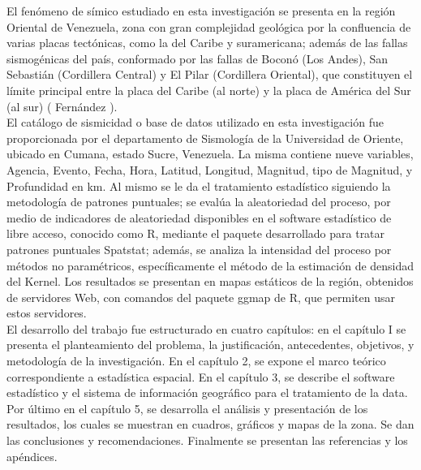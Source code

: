 \documentclass[12pt]{report}
\begin{document}
 El fenómeno de símico estudiado en esta investigación se presenta en la región Oriental de  Venezuela, zona con gran complejidad geológica por la confluencia de varias placas tectónicas, como la del  Caribe y suramericana;  además de las fallas sismogénicas del país, conformado por las fallas de Boconó (Los Andes), San Sebastián (Cordillera Central) y El Pilar (Cordillera Oriental), que constituyen el límite principal entre la placa del Caribe (al norte) y la placa de América del Sur (al sur) ( Fernández  \cite{Fernandez}). \\

El  catálogo de sismicidad o base de datos utilizado en esta investigación fue proporcionada por el departamento de Sismología de la Universidad de Oriente, ubicado en Cumana, estado Sucre, Venezuela. La misma  contiene nueve variables,  Agencia, Evento, Fecha,  Hora,  Latitud, Longitud, Magnitud, tipo de Magnitud, y Profundidad en km. Al mismo se le da el tratamiento estadístico siguiendo la metodología de patrones puntuales; se evalúa la aleatoriedad del proceso, por medio de indicadores de aleatoriedad disponibles en el software estadístico de libre acceso, conocido como R, mediante el paquete desarrollado para tratar patrones puntuales Spatstat; además, se analiza la intensidad del proceso por métodos  no paramétricos,  específicamente el método de la estimación de densidad del Kernel. Los resultados se presentan en mapas estáticos de la región, obtenidos de servidores Web, con comandos del paquete ggmap de R, que permiten usar estos servidores.   \\
  
El desarrollo del trabajo fue estructurado en cuatro capítulos: en el capítulo I se presenta el planteamiento del problema, la justificación, antecedentes, objetivos, y metodología de la investigación.  En el capítulo 2, se expone el marco teórico correspondiente a estadística espacial. En el capítulo 3, se describe el software estadístico y el sistema de información geográfico para el tratamiento de la data. Por último en el capítulo 5, se desarrolla el análisis y presentación de los resultados, los cuales se muestran en cuadros, gráficos y mapas de la zona. Se dan las conclusiones y recomendaciones. Finalmente se presentan las referencias y los apéndices. 



\setcounter{page}{1}
\pagestyle{plain}


\end{document}
